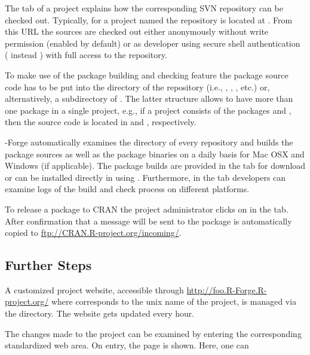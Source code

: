 The  tab of a project explains how the corresponding SVN
repository can be checked out. Typically, for a project named
 the repository is located at
. From
this URL the sources are checked out either 
anonymously without write permission (enabled by default) or as
developer using secure shell 
authentication ( instead ) with full
access to the repository.

To make use of the package building and checking feature
the package source code has to be put into the  directory
of the repository (i.e., ,
, , etc.) or, alternatively, a 
subdirectory of . The latter structure allows to
have more than one package in a single project, e.g., if
a project consists of the packages  and , then the
source code is located in  and ,
respectively.

\R{}-Forge automatically examines the  directory of
every repository and builds the package sources as well as the package
binaries on a daily basis for Mac OSX and Windows (if applicable). The
package builds 
are provided in the  tab for download or can be
installed directly in \R{} using 
. Furthermore, in the  tab developers can examine logs of the build and check
process on different platforms. 

To release a package to CRAN the project administrator clicks on
 in the  tab. After
confirmation that a message will be sent to 
the package is automatically copied to
\url{ftp://CRAN.R-project.org/incoming/}.


\subsection{Further Steps}

A customized project website, accessible through
\url{http://foo.R-Forge.R-project.org/} where  
corresponds to the unix name of the project, is managed via the
 directory. The website gets updated every hour. 

The changes made to the project can be examined by entering the
corresponding standardized web area. On entry, the 
page is shown. Here, one can 

